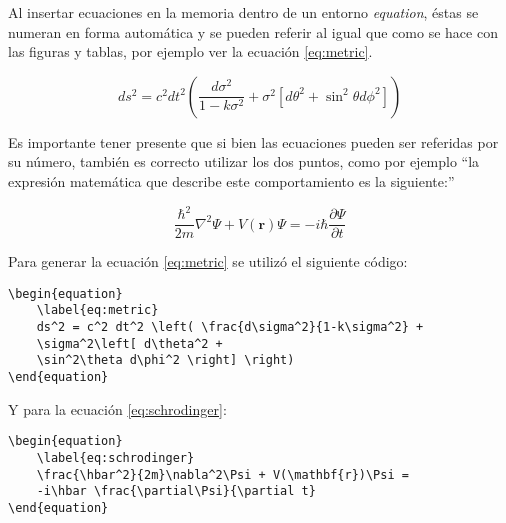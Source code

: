Al insertar ecuaciones en la memoria dentro de un entorno \textit{equation}, éstas se numeran en forma automática  y se pueden referir al igual que como se hace con las figuras y tablas, por ejemplo ver la ecuación \ref{eq:metric}.

\begin{equation}
	\label{eq:metric}
	ds^2 = c^2 dt^2 \left( \frac{d\sigma^2}{1-k\sigma^2} + \sigma^2\left[ d\theta^2 + \sin^2\theta d\phi^2 \right] \right)
\end{equation}
                                                        
Es importante tener presente que si bien las ecuaciones pueden ser referidas por su número, también es correcto utilizar los dos puntos, como por ejemplo ``la expresión matemática que describe este comportamiento es la siguiente:''

\begin{equation}
	\label{eq:schrodinger}
	\frac{\hbar^2}{2m}\nabla^2\Psi + V(\mathbf{r})\Psi = -i\hbar \frac{\partial\Psi}{\partial t}
\end{equation}

Para generar la ecuación \ref{eq:metric} se utilizó el siguiente código:

\begin{verbatim}
\begin{equation}
	\label{eq:metric}
	ds^2 = c^2 dt^2 \left( \frac{d\sigma^2}{1-k\sigma^2} + 
	\sigma^2\left[ d\theta^2 + 
	\sin^2\theta d\phi^2 \right] \right)
\end{equation}
\end{verbatim}

Y para la ecuación \ref{eq:schrodinger}:

\begin{verbatim}
\begin{equation}
	\label{eq:schrodinger}
	\frac{\hbar^2}{2m}\nabla^2\Psi + V(\mathbf{r})\Psi = 
	-i\hbar \frac{\partial\Psi}{\partial t}
\end{equation}

\end{verbatim}
